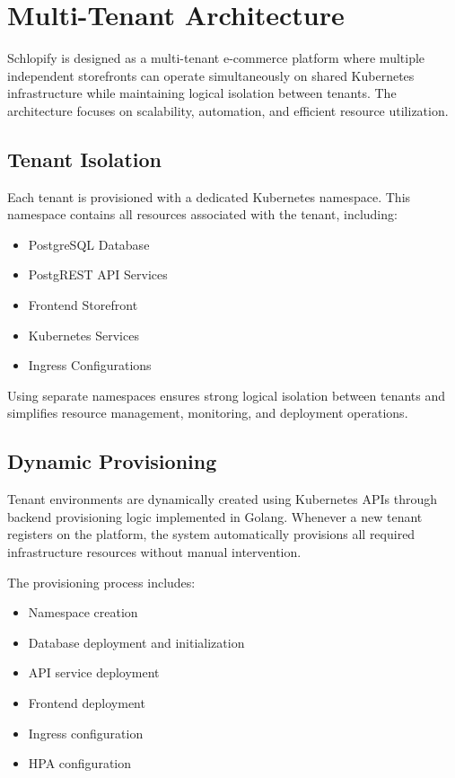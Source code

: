 \documentclass[12pt,a4paper]{report}
\begin{document}
\newpage

\chapter{Multi-Tenant Architecture}

Schlopify is designed as a multi-tenant e-commerce platform where multiple independent storefronts can operate simultaneously on shared Kubernetes infrastructure while maintaining logical isolation between tenants. The architecture focuses on scalability, automation, and efficient resource utilization.

\section{Tenant Isolation}

Each tenant is provisioned with a dedicated Kubernetes namespace. This namespace contains all resources associated with the tenant, including:

\begin{itemize}

    \item PostgreSQL Database
    \item PostgREST API Services
    \item Frontend Storefront
    \item Kubernetes Services
    \item Ingress Configurations

\end{itemize}

Using separate namespaces ensures strong logical isolation between tenants and simplifies resource management, monitoring, and deployment operations.

\section{Dynamic Provisioning}

Tenant environments are dynamically created using Kubernetes APIs through backend provisioning logic implemented in Golang. Whenever a new tenant registers on the platform, the system automatically provisions all required infrastructure resources without manual intervention.

The provisioning process includes:

\begin{itemize}

    \item Namespace creation
    \item Database deployment and initialization
    \item API service deployment
    \item Frontend deployment
    \item Ingress configuration
    \item HPA configuration

\end{itemize}
\end{document}
